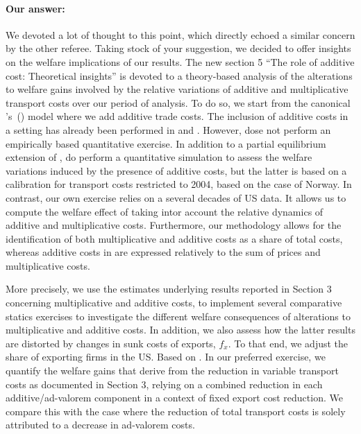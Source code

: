 \documentclass[a4paper,11pt]{article}
\newcommand\cites[1]{\citeauthor{#1}'s\ (\citeyear{#1})}
\begin{document}
\paragraph{Our answer:}
\noindent We devoted a lot of thought to this point, which directly echoed a similar concern by the other referee. Taking stock of your suggestion, we decided to offer insights on the welfare implications of our results. The new section 5 ``The role of additive cost: Theoretical insights'' is devoted to a theory-based analysis of the alterations to welfare gains involved by the relative variations of additive and multiplicative transport costs over our period of analysis. To do so, we start from the canonical \cites{melitz} model where we add additive trade costs. The inclusion of additive costs in a \citet{melitz} setting has already been performed in \citet{sorensen2014} and \citet{Irrazabal_2015}. However, \citet{sorensen2014} dose not perform an empirically based quantitative exercise. In addition to a partial equilibrium extension of \citet{melitz}, \citet{Irrazabal_2015} do perform a quantitative simulation to assess the welfare variations induced by the presence of additive costs, but the latter is based on a calibration for transport costs restricted to 2004, based on the case of Norway. In contrast, our own exercise relies on a several decades of US data. It allows us to compute the welfare effect of  taking intor account the relative dynamics of additive and multiplicative costs. Furthermore, our methodology allows for the identification of both multiplicative and additive costs as a share of total costs, whereas additive costs in \citet{Irrazabal_2015} are expressed relatively to the sum of prices and multiplicative costs.

More precisely, we use the estimates underlying results reported in Section 3 concerning multiplicative and additive costs, to implement several comparative statics exercises to investigate the different welfare consequences of alterations to multiplicative and additive costs. In addition, we also assess how the latter results are distorted by changes in sunk costs of exports, $f_{x}$. To that end, we adjust the share of exporting firms in the US. Based on \citet{BEJK-AER-03, Lincoln_McCallum2018}. In our preferred exercise, we quantify the welfare gains that derive from the reduction in variable transport costs as documented in Section 3, relying on a combined reduction in each additive/ad-valorem component in a context of fixed export cost reduction. We compare this with the case where the reduction of total transport costs  is solely attributed to a decrease in ad-valorem costs.
\end{document}

